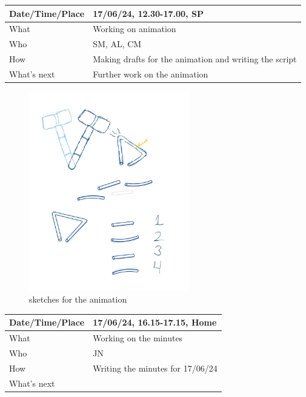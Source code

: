 \documentclass{article}
\begin{document}
\begin{table}[H]
\begin{tabular}{|p{1.5in}|p{4in}|}
\hline
Date/Time/Place & 17/06/24, 12.30-17.00, SP \\ \hline
What            & Working on animation \\ \hline
Who             & SM, AL, CM \\ \hline
How             & Making drafts for the animation and writing the script \\ \hline
What's next     & Further work on the animation \\ \hline
\end{tabular}
\end{table}

\begin{figure}[H]
    \centering
    \includegraphics[width=7cm]{Sketch animatie.jpg}
    \caption{sketches for the animation}   
\end{figure}

\begin{table}[H]
\begin{tabular}{|p{1.5in}|p{4in}|}
\hline
Date/Time/Place & 17/06/24, 16.15-17.15, Home \\ \hline
What            & Working on the minutes \\ \hline
Who             &  JN\\ \hline
How             & Writing the minutes for 17/06/24 \\ \hline
What's next     &  \\ \hline
\end{tabular}
\end{table}
\end{document}

